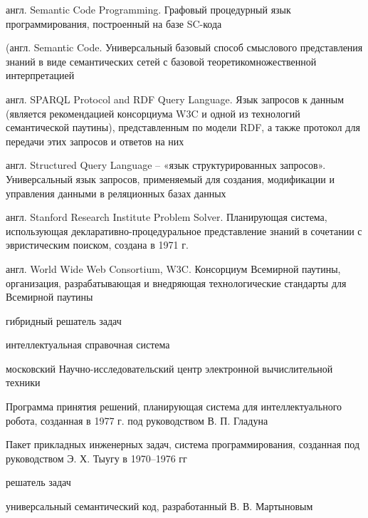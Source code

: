 \begin{description}[AAAAAAAA]
\item[SCP]{англ. Semantic Code Programming. Графовый процедурный язык программирования, построенный на базе SC-кода}
\item[SC-код]{(англ. Semantic Code. Универсальный базовый способ смыслового представления знаний в виде семантических сетей с базовой теоретикомножественной интерпретацией}
\item[SPARQL]{англ. SPARQL Protocol and RDF Query Language. Язык запросов к данным (является рекомендацией консорциума W3C и одной из технологий семантической паутины), представленным по модели RDF, а также протокол для передачи этих запросов и ответов на них}
\item[SQL]{англ. Structured Query Language -- «язык структурированных запросов». Универсальный язык запросов, применяемый для создания, модификации и управления данными в реляционных базах данных}
\item[STRIPS]{англ. Stanford Research Institute Problem Solver. Планирующая система, использующая декларативно-процедуральное представление знаний в сочетании с эвристическим поиском, создана в 1971 г.}
\item[W3C]{англ. World Wide Web Consortium, W3C. Консорциум Всемирной паутины, организация, разрабатывающая и внедряющая технологические стандарты для Всемирной паутины}
\item[ГРЗ]{гибридный решатель задач}
\item[ИСС]{интеллектуальная справочная система}
\item[НИЦ ЭВТ]{московский Научно-исследовательский центр электронной вычислительной техники}
\item[ППР]{Программа принятия решений, планирующая система для интеллектуального робота, созданная в 1977 г. под руководством В. П. Гладуна}
\item[ПРИЗ]{Пакет прикладных инженерных задач, система программирования, созданная под руководством Э. Х. Тыугу в 1970–1976 гг}
\item[РЗ]{решатель задач}
\item[УСК]{универсальный семантический код, разработанный В. В. Мартыновым}

\end{description}